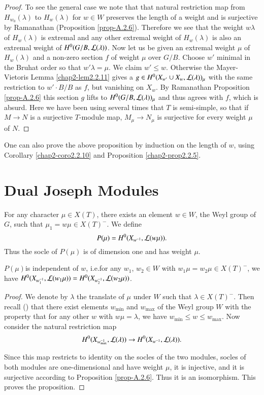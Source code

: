 \begin{proof}
To see the general case we note that that natural restriction map from
$H_{w_{0}}(\lambda)$ to $H_{w}(\lambda)$ for $w\in W$ preserves the
length of a weight and is surjective  by Ramanathan (Proposition
\ref{prop-A.2.6}). Therefore we see that the weight $w\lambda$ of
$H_{w}(\lambda)$ 
is extremal and any other extremal weight of $H_{w}(\lambda)$ is also
an extremal weight of $H^{0}(G/B,\mathcal{L}(\lambda))$. Now let us be given an
extremal weight $\mu$ of $H_{w}(\lambda)$ and a non-zero section $f$
of weight $\mu$ over $G/B$. Choose $w'$ minimal in the Bruhat order so
that $w'\lambda=\mu$. We claim $w'\leq w$. Otherwise the
Mayer-Vietoris Lemma \ref{chap2-lem2.2.11} gives a $g\in
H^{0}(X_{w'}\cup X_{w},\mathcal{L}(\lambda))_{\mu}$ with the same restriction
to $w'\cdot B/B$ as $f$, but vanishing on $X_{w}$. By Ramanathan
Proposition \ref{prop-A.2.6} this section $g$ lifts to
$H^{0}(G/B,\mathcal{L}(\lambda))_{\mu}$ and thus agrees with $f$, which is
absurd. Here we have been using several times that $T$ is semi-simple,
so that if $M\to N$ is a surjective $T$-module map, $M_{\mu}\to
N_{\mu}$ is surjective for every weight $\mu$ of $N$. 
\end{proof}

\begin{remark}\label{chap2-rem2.2.16}
One can also prove the above proposition by induction on the length of
$w$, using Corollary \ref{chap2-coro2.2.10} and Proposition
\ref{chap2-prop2.2.5}. 
\end{remark}

\section{Dual Joseph Modules}\label{chap2-sec2.3}

For any character $\mu\in X(T)$, there exists an element $w\in W$, the
Weyl group of $G$, such that $\mu_{1}=w\mu\in X(T)^{-}$. We define
$$
P(\mu)=H^{0}(X_{w^{-1}},\mathcal{L}(w\mu)).
$$ 
Thus the socle of $P(\mu)$ is of
dimension one and has weight $\mu$. 

\begin{lemma}\label{chap2-lem2.3.1}
$P(\mu)$\pageoriginale is\label{page19} independent of $w$, i.e.\@ for any $w_{1}$,
  $w_{2}\in W$ with $w_{1}\mu=w_{2}\mu\in X(T)^{-}$, we have
  $H^{0}(X_{w_{1}^{-1}},\mathcal{L}(w_{1}\mu))=H^{0}(X_{w_{2}^{-1}},\mathcal{L}(w_{2}\mu))$. 
\end{lemma}

\begin{proof}
We denote by $\lambda$ the translate of $\mu$ under $W$ such that
$\lambda\in X(T)^{-}$. Then recall (\cite[1.8, 1.10, 1.12]{key9}) that
there exist elements $w_{\min}$ and $w_{\max}$ of the Weyl group $W$
with the property that for any other $w$ with $w\mu=\lambda$, we have
$w_{\min}\leq w\leq w_{\max}$. Now consider the natural restriction
map
$$
H^{0}(X_{w^{-1}_{\max}},\mathcal{L}(\lambda))\to H^{0}(X_{w^{-1}},\mathcal{L}(\lambda)).
$$

Since this map restricts to identity on the socles of the two modules,
socles of both modules are one-dimensional and have weight $\mu$, it
is injective, and it is surjective according to Proposition
\ref{prop-A.2.6}. Thus it is an isomorphism. This proves the proposition.
\end{proof}

